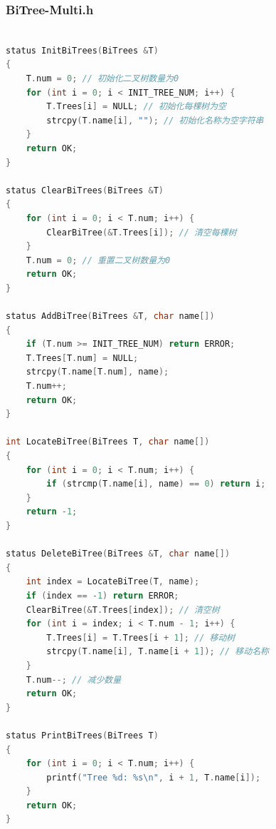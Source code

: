\documentclass[supercite]{Experimental_Report}
\theoremstyle{definition}
\begin{document}
\subsubsection*{BiTree-Multi.h}
\begin{lstlisting}[language=C, caption={BiTree-Multi.h}, label=lst:bi_tree_multi_h]

status InitBiTrees(BiTrees &T)
{
    T.num = 0; // 初始化二叉树数量为0
    for (int i = 0; i < INIT_TREE_NUM; i++) {
        T.Trees[i] = NULL; // 初始化每棵树为空
        strcpy(T.name[i], ""); // 初始化名称为空字符串
    }
    return OK;
}

status ClearBiTrees(BiTrees &T)
{
    for (int i = 0; i < T.num; i++) {
        ClearBiTree(&T.Trees[i]); // 清空每棵树
    }
    T.num = 0; // 重置二叉树数量为0
    return OK;
}

status AddBiTree(BiTrees &T, char name[])
{
    if (T.num >= INIT_TREE_NUM) return ERROR; 
    T.Trees[T.num] = NULL; 
    strcpy(T.name[T.num], name); 
    T.num++; 
    return OK;
}

int LocateBiTree(BiTrees T, char name[])
{
    for (int i = 0; i < T.num; i++) {
        if (strcmp(T.name[i], name) == 0) return i; 
    }
    return -1; 
}

status DeleteBiTree(BiTrees &T, char name[])
{
    int index = LocateBiTree(T, name); 
    if (index == -1) return ERROR; 
    ClearBiTree(&T.Trees[index]); // 清空树
    for (int i = index; i < T.num - 1; i++) {
        T.Trees[i] = T.Trees[i + 1]; // 移动树
        strcpy(T.name[i], T.name[i + 1]); // 移动名称
    }
    T.num--; // 减少数量
    return OK;
}

status PrintBiTrees(BiTrees T)
{
    for (int i = 0; i < T.num; i++) {
        printf("Tree %d: %s\n", i + 1, T.name[i]); 
    }
    return OK;
}
\end{lstlisting}
\end{document}
